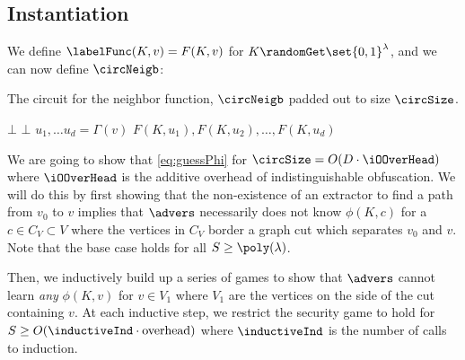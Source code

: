 \subsection{Instantiation}
We define 
$
	\labelFunc(K, v) = F(K, v)
$ for $K \randomGet \set{0, 1}^\lambda$, and we can now define $\circNeigb$:
\begin{algorithm}[H]
	\caption{
		The circuit for the neighbor function, $\circNeigb$ padded out to size $\circSize$.
	}
	\begin{algorithmic}[1]
				\State \Return $\bot$
			\EndIf
				\State \Return $\bot$
			\EndIf
			\State $u_1, \dots u_d = \Gamma(v)$
			\State \Return $F(K, u_1), F(K, u_2), \dots, F(K, u_d)$
		\EndFunction
	\end{algorithmic}
	\label{alg:neighb}
\end{algorithm}

We are going to show that \cref{eq:guessPhi} for $\circSize = O(D \cdot \iOOverHead)$ where $\iOOverHead$ is the additive overhead of indistinguishable obfuscation.
We will do this by first showing that the non-existence of an extractor to find a path from $v_0$ to $v$ implies that $\advers$
necessarily does not know $\phi(K, c)$ for a $c \in C_V \subset V$ where the vertices in $C_V$ border 
a graph cut which separates $v_0$ and $v$. Note that the base case holds for all $S \geq \poly(\lambda)$. 

Then, we inductively build up a series of games to show that
$\advers$ cannot learn \emph{any} $\phi(K, v)$ for $v \in V_1$ where $V_1$ are the vertices on the side of the cut containing $v$.
At each inductive step, we restrict the security game to hold for $S \geq O(\inductiveInd \cdot \text{overhead})$ where $\inductiveInd$ is the number of calls to induction.

